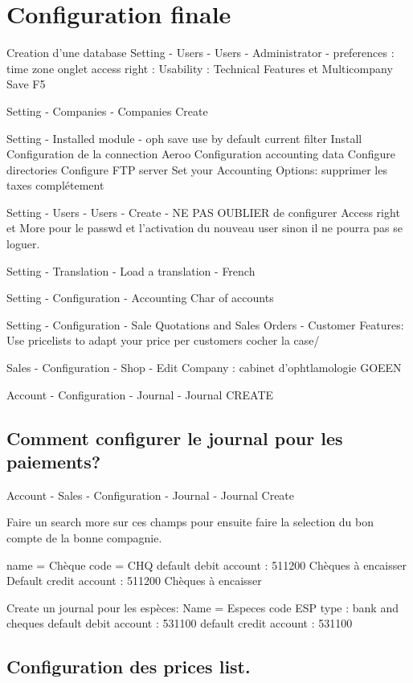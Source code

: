 \documentclass[12pt,a4paper]{article}
\begin{document}
\section{Configuration finale}
\label{sec:final_config}

Creation d'une database
Setting - Users - Users - Administrator - preferences : time zone
onglet access right : Usability : Technical Features et Multicompany
Save
F5

Setting - Companies - Companies Create 

Setting - Installed module - oph save use by default current filter
Install
Configuration de la connection Aeroo
Configuration accounting data
Configure directories
Configure FTP server
Set your Accounting Options: supprimer les taxes complétement

Setting - Users - Users - Create - NE PAS OUBLIER de configurer Access right et More pour le passwd et l'activation du nouveau user sinon  il ne pourra pas se loguer.

Setting - Translation - Load a translation - French

Setting - Configuration - Accounting Char of accounts

Setting - Configuration - Sale Quotations and Sales Orders - 
Customer Features: Use pricelists to adapt your price per customers cocher la case/

Sales - Configuration - Shop - Edit Company : cabinet d'ophtlamologie GOEEN 

Account - Configuration - Journal - Journal CREATE

\subsection{Comment configurer le journal pour les paiements?}
\label{sec:paiement_journal}

Account - Sales - Configuration - Journal - Journal Create 

Faire un search more sur ces champs pour ensuite faire la selection du bon compte de la bonne compagnie. 

name = Chèque
code = CHQ
default debit account : 511200 Chèques à encaisser
Default credit account : 511200 Chèques à encaisser


Create un journal pour les espèces:
Name = Especes
code ESP 
type : bank and cheques
default debit account : 531100
default credit account : 531100


\subsection{Configuration des prices list.}
\label{sec:price_list_config}
\end{document}
